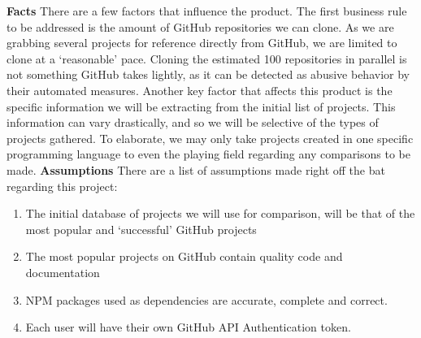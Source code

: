 \documentclass{article}
\begin{document}
\noindent
\textbf{Facts}
\newline
\newline
There are a few factors that influence the product. The first business rule to be addressed is the amount of GitHub repositories we can clone. As we are grabbing several projects for reference directly from GitHub, we are limited to clone at a ‘reasonable’ pace. Cloning the estimated 100 repositories in parallel is not something GitHub takes lightly, as it can be detected as abusive behavior by their automated measures.\cite{GitHubLimit} Another key factor that affects this product is the specific information we will be extracting from the initial list of projects. This information can vary drastically, and so we will be selective of the types of projects gathered. To elaborate, we may only take projects created in one specific programming language to even the playing field regarding any comparisons to be made.
\newline
\newline 
\textbf{Assumptions}
\newline
\newline 
There are a list of assumptions made right off the bat regarding this project:
\begin{enumerate}
\item The initial database of projects we will use for comparison, will be that of the most popular and ‘successful’ GitHub projects
\item The most popular projects on GitHub contain quality code and documentation
\item NPM packages used as dependencies are accurate, complete and correct. 
\item Each user will have their own GitHub API Authentication token. 

\end{enumerate}

\end{document}
